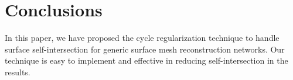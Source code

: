 \section{Conclusions}
In this paper, we have proposed the cycle regularization technique to handle surface self-intersection for generic surface mesh reconstruction networks. Our technique is easy to implement and effective in reducing self-intersection in the results.